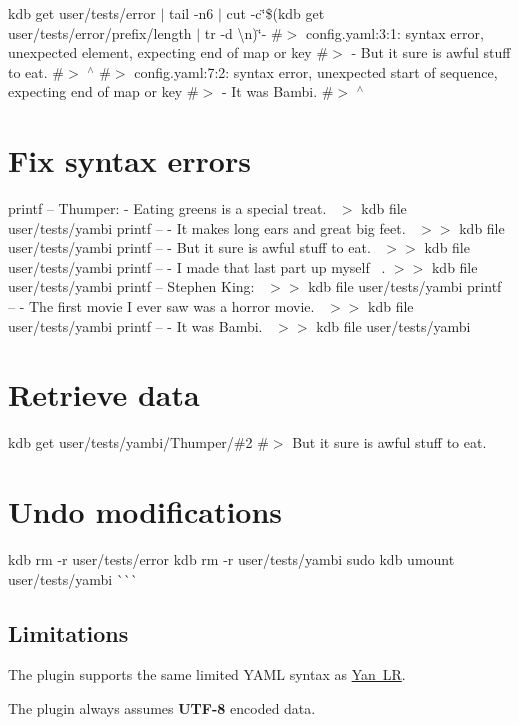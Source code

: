 kdb get user/tests/error $\vert$ tail -\/n6 $\vert$ cut -\/c\char`\"{}\$(kdb get user/tests/error/prefix/length $\vert$ tr -\/d \textquotesingle{}\textbackslash{}n\textquotesingle{})\char`\"{}-\/ \#$>$ config.\+yaml\+:3\+:1\+: syntax error, unexpected element, expecting end of map or key \#$>$ -\/ But it sure is awful stuff to eat. \#$>$ $^\wedge$ \#$>$ config.\+yaml\+:7\+:2\+: syntax error, unexpected start of sequence, expecting end of map or key \#$>$ -\/ It was Bambi. \#$>$ $^\wedge$\hypertarget{autotoc_md753_autotoc_md776}{}\section{Fix syntax errors}\label{autotoc_md753_autotoc_md776}
printf -- \textquotesingle{}Thumper\+: -\/ Eating greens is a special treat.~\newline
\textquotesingle{} $>$ {\ttfamily kdb file user/tests/yambi} printf -- \textquotesingle{} -\/ It makes long ears and great big feet.~\newline
\textquotesingle{} $>$$>$ {\ttfamily kdb file user/tests/yambi} printf -- \textquotesingle{} -\/ But it sure is awful stuff to eat.~\newline
\textquotesingle{} $>$$>$ {\ttfamily kdb file user/tests/yambi} printf -- \textquotesingle{} -\/ I made that last part up myself~\newline
.\textquotesingle{} $>$$>$ {\ttfamily kdb file user/tests/yambi} printf -- \textquotesingle{}Stephen King\+:~\newline
\textquotesingle{} $>$$>$ {\ttfamily kdb file user/tests/yambi} printf -- \textquotesingle{} -\/ The first movie I ever saw was a horror movie.~\newline
\textquotesingle{} $>$$>$ {\ttfamily kdb file user/tests/yambi} printf -- \textquotesingle{} -\/ It was Bambi.~\newline
\textquotesingle{} $>$$>$ {\ttfamily kdb file user/tests/yambi}\hypertarget{autotoc_md753_autotoc_md777}{}\section{Retrieve data}\label{autotoc_md753_autotoc_md777}
kdb get user/tests/yambi/\+Thumper/\#2 \#$>$ But it sure is awful stuff to eat.\hypertarget{autotoc_md753_autotoc_md778}{}\section{Undo modifications}\label{autotoc_md753_autotoc_md778}
kdb rm -\/r user/tests/error kdb rm -\/r user/tests/yambi sudo kdb umount user/tests/yambi \`{}\`{}\`{}\hypertarget{autotoc_md753_autotoc_md779}{}\subsection{Limitations}\label{autotoc_md753_autotoc_md779}
The plugin supports the same limited Y\+A\+ML syntax as \mbox{\hyperlink{autotoc_md861_src_plugins_yanlr_README_md}{Yan LR}}.


\begin{DoxyItemize}
\item The plugin always assumes {\bfseries{U\+T\+F-\/8}} encoded data. 
\end{DoxyItemize}